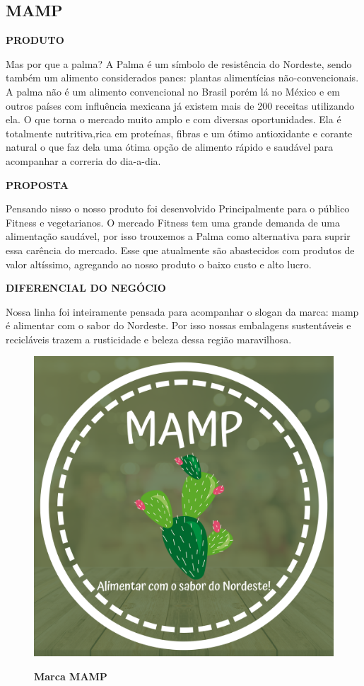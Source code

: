 \subsection{MAMP}

\textbf{PRODUTO}

Mas por que a palma? A Palma é um símbolo de resistência do Nordeste, sendo também um alimento considerados pancs: plantas alimentícias não-convencionais. A palma não é um alimento convencional no Brasil porém lá no México e em outros países com influência mexicana já existem mais de 200 receitas utilizando ela. O que torna o mercado muito amplo e com diversas oportunidades. Ela é totalmente nutritiva,rica em proteínas, fibras e um ótimo antioxidante e corante natural o que faz dela uma ótima opção de alimento rápido e saudável para acompanhar a correria do dia-a-dia.

\textbf{PROPOSTA}

Pensando nisso o nosso produto foi desenvolvido Principalmente para o público Fitness e vegetarianos. O mercado Fitness tem uma grande demanda de uma alimentação saudável, por isso trouxemos a Palma como alternativa para suprir essa carência do mercado. Esse que atualmente são abastecidos com produtos de valor altíssimo, agregando ao nosso produto o baixo custo e alto lucro.

\textbf{DIFERENCIAL DO NEGÓCIO}

Nossa linha foi inteiramente pensada para acompanhar o slogan da marca: mamp é alimentar com o sabor do Nordeste. Por isso nossas embalagens sustentáveis e recicláveis trazem a rusticidade e beleza dessa região maravilhosa.



\begin{figure}[!htb]
\centering
\caption{\textbf{Marca MAMP}}
\includegraphics[scale=0.1]{Imagens/mamp.png}
\label{figura_22}
\end{figure}
\newpage




